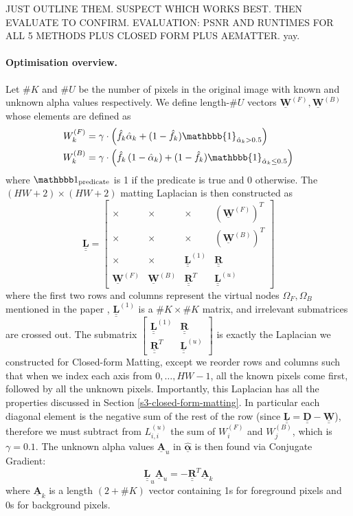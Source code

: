 \documentclass{article}
\def\vt#1{\underline{\mathbf{#1}}}
\def\vts#1{\underline{\boldsymbol{#1}}}
\def\mt#1{\underline{\underline{\mathbf{#1}}}}
\begin{document}
\begin{multicols}{2}[]
JUST OUTLINE THEM. SUSPECT WHICH WORKS BEST. THEN EVALUATE TO CONFIRM.
EVALUATION: PSNR AND RUNTIMES FOR ALL 5 METHODS PLUS  CLOSED FORM PLUS AEMATTER. yay.



\paragraph{Optimisation overview.} Let $\#K$ and $\#U$ be the number of pixels in the original image with known and unknown alpha values respectively. We define length-$\#U$ vectors $\vt W^{(F)}, \vt W^{(B)}$ whose elements are defined as
\begin{align*}
    W^{(F)}_k &= \gamma\cdot\left(\hat f_k \hat{\alpha}_k + (1-\hat f_k) \mathbbb{1}_{\hat{\alpha}_k > 0.5} \right)\\
    W^{(B)}_k &= \gamma\cdot\left(\hat f_k \left(1-\hat{\alpha}_k\right) + (1-\hat f_k) \mathbbb{1}_{\hat{\alpha}_k \leq 0.5} \right)
\end{align*}
where $\mathbbb1_\text{predicate}$ is 1 if the predicate is true and 0 otherwise. The $(HW+2)\times(HW+2)$ matting Laplacian is then constructed as
$$\mt L = \left[\begin{smallmatrix}
    \times & \times & \times & \left(\vt W^{(F)}\right)^T \\
    \times & \times & \times & \left(\vt W^{(B)}\right)^T \\
    \times & \times & \mt L^{(1)} & \mt R \\
    \vt W^{(F)} & \vt W^{(B)} & \mt R^T & \mt L^{(u)}
\end{smallmatrix}\right]$$
where the first two rows and columns represent the virtual nodes $\Omega_F,\Omega_B$ mentioned in the paper \cite[\S4.3]{robust-matting}, $\mt L^{(1)}$ is a $\#K \times \#K$ matrix, and irrelevant submatrices are crossed out. The submatrix $\left[\begin{smallmatrix}\mt L^{(1)} & \mt R \\ \mt R^T & \mt L^{(u)}\end{smallmatrix}\right]$ is exactly the Laplacian we constructed for Closed-form Matting, except we reorder rows and columns such that when we index each axis from $0,\dots,HW-1$, all the known pixels come first, followed by all the unknown pixels. Importantly, this Laplacian has all the properties discussed in Section \ref{s3-closed-form-matting}. In particular each diagonal element is the negative sum of the rest of the row (since $\mt L = \mt D - \mt W$), therefore we must subtract from $L^{(u)}_{i,i}$ the sum of $W^{(F)}_i$ and $W^{(B)}_j$, which is $\gamma=0.1$. The unknown alpha values $\vt A_u$ in $\hat{\vts \alpha}$ is then found via Conjugate Gradient:
$$\mt L_u \vt A_u = -\mt R^T \vt A_k$$
where $\vt A_k$ is a length $(2+\# K)$ vector containing 1s for foreground pixels and 0s for background pixels.


\end{multicols}
\end{document}

